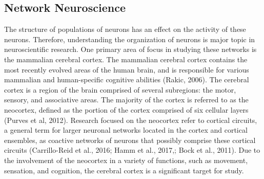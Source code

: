 \documentclass[11pt,titlepage]{article}
\begin{document}
\subsection{Network Neuroscience}
The structure of populations of neurons has an effect on the activity of these neurons. Therefore, understanding the organization of neurons is major topic in neuroscientific research. One primary area of focus in studying these networks is the mammalian cerebral cortex. The mammalian cerebral cortex contains the most recently evolved areas of the human brain, and is responsible for various mammalian and human-specific cognitive abilities (Rakic, 2006). The cerebral cortex is a region of the brain comprised of several subregions: the motor, sensory, and associative areas. The majority of the cortex is referred to as the neocortex, defined as the portion of the cortex comprised of six cellular layers (Purves et al, 2012). %
Research focused on the neocortex refer to cortical circuits, a general term for larger neuronal networks located in the cortex and cortical ensembles, as coactive networks of neurons that possibly comprise these cortical circuits (Carrillo-Reid et al., 2016; Hamm et al., 2017,; Bock et al., 2011).  Due to the involvement of the neocortex in a variety of functions, such as movement, sensation, and cognition, the cerebral cortex is a significant target for study.\par
\end{document}
